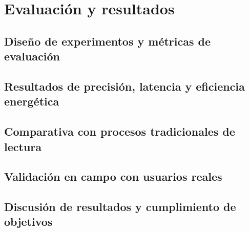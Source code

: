 \chapter{Evaluación y resultados}
\label{chap:evaluation_results}

\section{Diseño de experimentos y métricas de evaluación}
\label{sec:experiment_design}

\section{Resultados de precisión, latencia y eficiencia energética}
\label{sec:performance_results}

\section{Comparativa con procesos tradicionales de lectura}
\label{sec:traditional_comparison}

\section{Validación en campo con usuarios reales}
\label{sec:field_validation}

\section{Discusión de resultados y cumplimiento de objetivos}
\label{sec:results_discussion}
